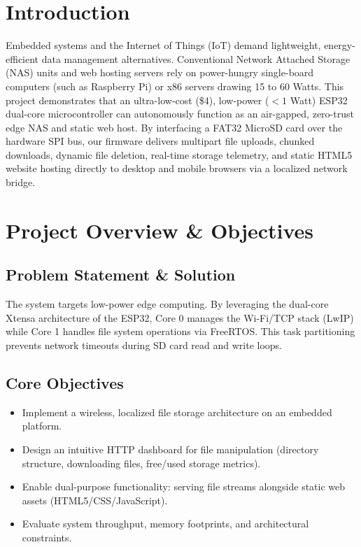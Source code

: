 \documentclass[conference]{IEEEtran}
\begin{document}
\section{Introduction}
Embedded systems and the Internet of Things (IoT) demand lightweight, energy-efficient data management alternatives. Conventional Network Attached Storage (NAS) units and web hosting servers rely on power-hungry single-board computers (such as Raspberry Pi) or x86 servers drawing 15 to 60 Watts. This project demonstrates that an ultra-low-cost (\$4), low-power ($<1$ Watt) ESP32 dual-core microcontroller can autonomously function as an air-gapped, zero-trust edge NAS and static web host. By interfacing a FAT32 MicroSD card over the hardware SPI bus, our firmware delivers multipart file uploads, chunked downloads, dynamic file deletion, real-time storage telemetry, and static HTML5 website hosting directly to desktop and mobile browsers via a localized network bridge.

\section{Project Overview \& Objectives}

\subsection{Problem Statement \& Solution}
The system targets low-power edge computing. By leveraging the dual-core Xtensa architecture of the ESP32, Core 0 manages the Wi-Fi/TCP stack (LwIP) while Core 1 handles file system operations via FreeRTOS. This task partitioning prevents network timeouts during SD card read and write loops.

\subsection{Core Objectives}
\begin{itemize}
    \item Implement a wireless, localized file storage architecture on an embedded platform.
    \item Design an intuitive HTTP dashboard for file manipulation (directory structure, downloading files, free/used storage metrics).
    \item Enable dual-purpose functionality: serving file streams alongside static web assets (HTML5/CSS/JavaScript).
    \item Evaluate system throughput, memory footprints, and architectural constraints.
\end{itemize}
\end{document}
